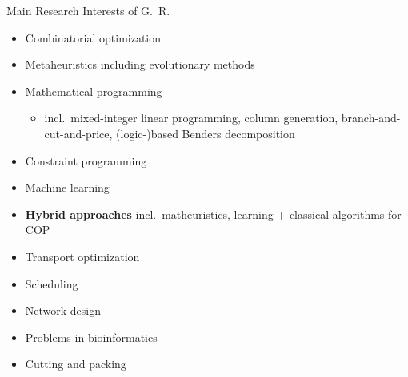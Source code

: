 \documentclass[aspectratio=1610]{beamer}
\newcommand{\important}[1]{{\color{green!60!black}#1}}
\begin{document}
\begin{frame}{Main Research Interests of G.~R.}
    \begin{itemize}
      \item Combinatorial optimization
      \item Metaheuristics including evolutionary methods
      \item Mathematical programming
      \begin{itemize}
        \item incl.\ mixed-integer linear programming, column generation, branch-and-cut-and-price, (logic-)based Benders decomposition
      \end{itemize}
      \item Constraint programming
      \item Machine learning
      \item \important{\bf Hybrid approaches} incl.\ matheuristics, learning + classical algorithms for COP
    \end{itemize} 
    
    \vspace{0.3cm}
    \begin{itemize}
      \item Transport optimization
      \item Scheduling
      \item Network design
      \item Problems in bioinformatics
      \item Cutting and packing
    \end{itemize}
\end{frame}
\end{document}

